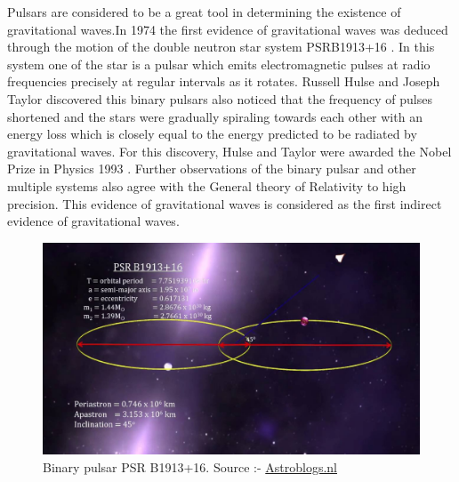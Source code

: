 Pulsars are considered to be a great tool in determining the existence of gravitational waves.In 1974 the first evidence of gravitational waves was deduced through the motion of the double neutron star system PSRB1913+16  \cite{Linear}. In this system one of the star is a pulsar which emits electromagnetic pulses at radio frequencies precisely at regular intervals as it rotates. Russell Hulse and Joseph Taylor discovered this binary pulsars also noticed that the frequency of pulses shortened and the stars were gradually spiraling towards each other with an energy loss which is closely equal to the energy predicted to be radiated by gravitational waves. For this discovery, Hulse and Taylor were awarded the Nobel Prize in Physics 1993 \cite{Lommen_2015}. Further observations of the binary pulsar and other multiple systems also agree with the General theory of Relativity to high precision. This evidence of gravitational waves is considered as the first indirect evidence of gravitational waves. 
 
\begin{figure}[h]
    \centering
    \includegraphics[scale=0.255]{images.tex/PSR-B191316.jpg}
    \caption{Binary pulsar PSR B1913+16. Source :- \href{https://www.astroblogs.nl/wp-content/uploads/2014/03/PSR-B191316.jpg}{Astroblogs.nl}}
\end{figure}

\pagebreak
